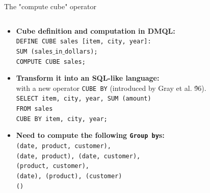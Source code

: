 \documentclass[aspectratio=169,t]{beamer}
\begin{document}
  { 
    \begin{frame}{The "compute cube" operator}
      \begin{columns}
        \begin{column}{0.6\textwidth}
          \vspace{-5cm}
          \begin{itemize}
            \item \textbf{Cube definition and computation in DMQL:} \\
                  \texttt{DEFINE CUBE sales [item, city, year]:}\\
                  \texttt{SUM (sales$\_$in$\_$dollars);}\\
                  \texttt{COMPUTE CUBE sales;}
            \item \textbf{Transform it into an SQL-like language:}\\
            with a new operator \texttt{CUBE BY} (introduced by Gray et al. \'96).\\
            \texttt{SELECT item, city, year, SUM (amount)}\\
            \texttt{FROM sales}\\
            \texttt{CUBE BY item, city, year;}
            \item \textbf{Need to compute the following \texttt{Group by}s:}\\
            \texttt{(date, product, customer),}\\
            \texttt{(date, product), (date, customer),}\\
            \texttt{(product, customer),}\\
            \texttt{(date), (product), (customer)}\\
            \texttt{()}
          \end{itemize}
        \end{column}
        \begin{column}{0.3\textwidth}  %
        \end{column}
      \end{columns}
    \end{frame}
  }
\end{document}
